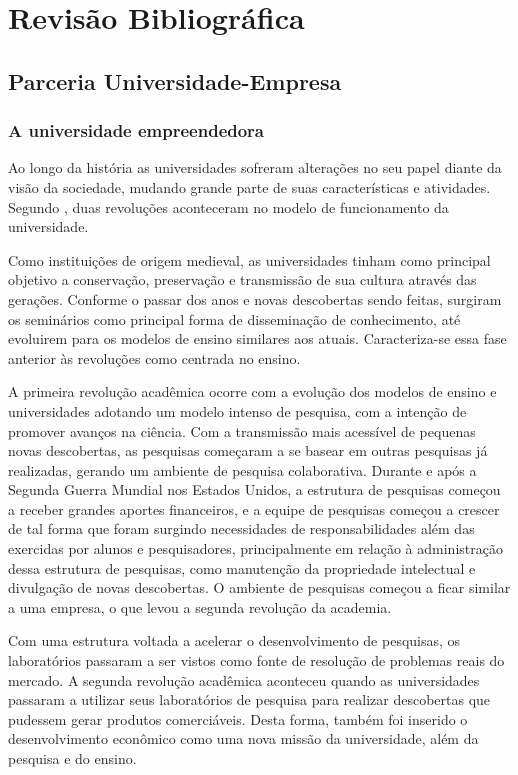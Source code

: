 \chapter[Revisão Bibliográfica]{Revisão Bibliográfica}
\label{chap:revisao}
\section{Parceria Universidade-Empresa}
\label{cha:ensino}
\subsection{A universidade empreendedora}
\label{cha:univ_empreend}

Ao longo da história as universidades sofreram alterações no seu papel diante da visão da sociedade, mudando grande parte de suas características e atividades. Segundo , duas revoluções aconteceram no modelo de funcionamento da universidade.

Como instituições de origem medieval, as universidades tinham como principal objetivo a conservação, preservação e transmissão de sua cultura através das gerações. Conforme o passar dos anos e novas descobertas sendo feitas, surgiram os seminários como principal forma de disseminação de conhecimento, até evoluirem para os modelos de ensino similares aos atuais. Caracteriza-se essa fase anterior às revoluções como centrada no ensino.

A primeira revolução acadêmica ocorre com a evolução dos modelos de ensino e universidades adotando um modelo intenso de pesquisa, com a intenção de promover avanços na ciência. Com a transmissão mais acessível de pequenas novas descobertas, as pesquisas começaram a se basear em outras pesquisas já realizadas, gerando um ambiente de pesquisa colaborativa.  Durante e após a Segunda Guerra Mundial nos Estados Unidos, a estrutura de pesquisas começou a receber grandes aportes financeiros, e a equipe de pesquisas começou a crescer de tal forma que foram surgindo necessidades de responsabilidades além das exercidas por alunos e pesquisadores, principalmente em relação à administração dessa estrutura de pesquisas, como manutenção da propriedade intelectual e divulgação de novas descobertas. O ambiente de pesquisas começou a ficar similar a uma empresa, o que levou a segunda revolução da academia.

Com uma estrutura voltada a acelerar o desenvolvimento de pesquisas, os laboratórios passaram a ser vistos como fonte de resolução de problemas reais do mercado. A segunda revolução acadêmica aconteceu quando as universidades passaram a utilizar seus laboratórios de pesquisa para realizar descobertas que pudessem gerar produtos comerciáveis. Desta forma, também foi inserido o desenvolvimento econômico como uma nova missão da universidade, além da pesquisa e do ensino.

